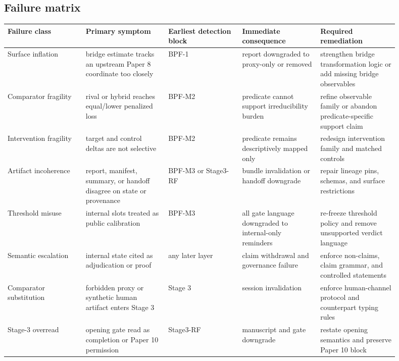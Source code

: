 \documentclass[11pt,a4paper]{article}
\theoremstyle{definition}
\begin{document}
\subsection{Failure matrix}
\begin{center}
\small
\begin{tabularx}{\linewidth}{@{}p{0.18\linewidth}p{0.19\linewidth}p{0.17\linewidth}p{0.18\linewidth}p{0.18\linewidth}@{}}
\toprule
Failure class & Primary symptom & Earliest detection block & Immediate consequence & Required remediation \\
\midrule
Surface inflation & bridge estimate tracks an upstream Paper 8 coordinate too closely & BPF-1 & report downgraded to proxy-only or removed & strengthen bridge transformation logic or add missing bridge observables \\
Comparator fragility & rival or hybrid reaches equal/lower penalized loss & BPF-M2 & predicate cannot support irreducibility burden & refine observable family or abandon predicate-specific support claim \\
Intervention fragility & target and control deltas are not selective & BPF-M2 & predicate remains descriptively mapped only & redesign intervention family and matched controls \\
Artifact incoherence & report, manifest, summary, or handoff disagree on state or provenance & BPF-M3 or Stage3-RF & bundle invalidation or handoff downgrade & repair lineage pins, schemas, and surface restrictions \\
Threshold misuse & internal slots treated as public calibration & BPF-M3 & all gate language downgraded to internal-only reminders & re-freeze threshold policy and remove unsupported verdict language \\
Semantic escalation & internal state cited as adjudication or proof & any later layer & claim withdrawal and governance failure & enforce non-claims, claim grammar, and controlled statements \\
Comparator substitution & forbidden proxy or synthetic human artifact enters Stage 3 & Stage 3 & session invalidation & enforce human-channel protocol and counterpart typing rules \\
Stage-3 overread & opening gate read as completion or Paper 10 permission & Stage3-RF & manuscript and gate downgrade & restate opening semantics and preserve Paper 10 block \\
\bottomrule
\end{tabularx}
\end{center}
\end{document}
